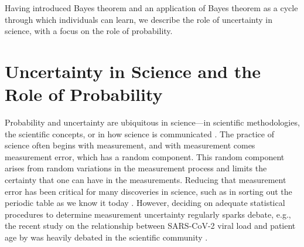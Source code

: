 \documentclass[man]{apa7}
\begin{document}
Having introduced Bayes theorem and an application of Bayes theorem as a cycle through which individuals can learn, we describe the role of uncertainty in science, with a focus on the role of probability.

\section{Uncertainty in Science and the Role of Probability}

Probability and uncertainty are ubiquitous in science—in scientific methodologies, the scientific concepts, or in how science is communicated \textcite{gsoobmc17}. The practice of science often begins with measurement, and with measurement comes measurement error, which has a random component. This random component arises from random variations in the measurement process and limits the certainty that one can have in the measurements. Reducing that measurement error has been critical for many discoveries in science, such as in sorting out the periodic table as we know it today \textcite{fco15}. However, deciding on adequate statistical procedures to determine measurement uncertainty regularly sparks debate, e.g., the recent study on the relationship between SARS-CoV-2 viral load and patient age by \textcite{jmvbzhd20} was heavily debated in the scientific community \parencite{frick_peer-review_2020}.
\end{document}
